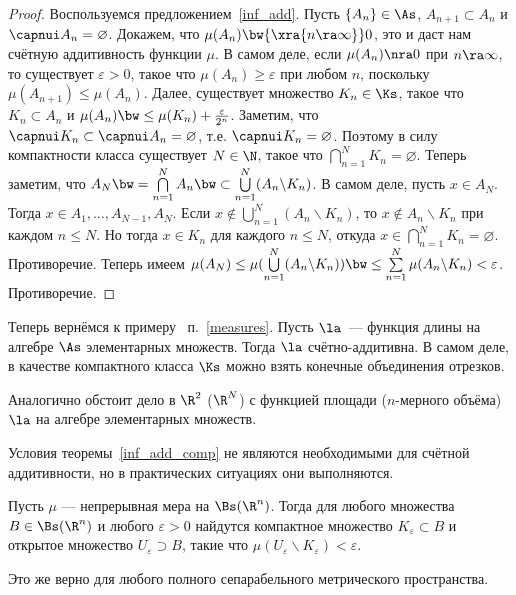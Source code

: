 \documentclass[10pt]{article}
\newcommand{\ve}{\varepsilon}
\begin{document}
\begin{proof}
Воспользуемся предложением~\ref{inf_add}. Пусть $\{A_n\}\in\As$,
$A_{n+1}\subset A_n$ и $\capnui A_n=\varnothing$. Докажем, что
$\mu(A_n) \bw{\mathbin{\xra{n\ra\infty}}}0$, это и даст нам счётную
аддитивность функции $\mu$. В самом деле, если $\mu(A_n)\nra0$ при
$n\ra\infty$, то существует $\ve>0$, такое что $\mu(A_n)\ge\ve$ при
любом $n$, поскольку $\mu(A_{n+1})\le\mu(A_n)$. Далее, существует
множество $K_n\in\Ks$, такое что $K_n\subset A_n$ и $\mu(A_n)\bw\le
\mu(K_n)+\frac{\ve}{2^n}$. Заметим, что $\capnui K_n\subset\capnui
A_n=\varnothing$, т.е. $\capnui K_n=\varnothing$. Поэтому в силу
компактности класса существует $N\in\N$, такое что
$\bigcap\limits_{n=1}^N K_n=\varnothing$. Теперь заметим, что
$A_N\bw =\bigcap\limits_{n=1}^NA_n\bw \subset
\bigcup\limits_{n=1}^N(A_n\backslash K_n)$. В самом деле, пусть
$x\in A_N$. Тогда $x\in A_1,\ldots,A_{N-1},A_N$. Если
$x\notin\bigcup\limits_{n=1}^N(A_n\backslash K_n)$, то $x\notin
A_n\backslash K_n$ при каждом $n\le N$. Но тогда $x\in K_n$ для
каждого $n\le N$, откуда
$x\in\bigcap\limits_{n=1}^NK_n=\varnothing$. Противоречие. Теперь
имеем $\mu(A_N)\le\mu(\bigcup\limits_{n=1}^N(A_n\backslash K_n))
\bw\le\sum\limits_{n=1}^N\mu(A_n\backslash K_n)<\ve$. Противоречие.
\end{proof}

Теперь вернёмся к примеру~ п.~\ref{measures}. Пусть $\la$~---
функция длины на алгебре $\As$ элементарных множеств. Тогда $\la$
счётно-аддитивна. В самом деле, в качестве компактного класса $\Ks$
можно взять конечные объединения отрезков.

Аналогично обстоит дело в $\R^2$ ($\R^N$) с функцией площади
($n$-мерного объёма) $\la$ на алгебре элементарных множеств.

\begin{note}
Условия теоремы~\ref{inf_add_comp} не являются необходимыми для
счётной аддитивности, но в практических ситуациях они выполняются.
\end{note}

\begin{problem}
Пусть $\mu$ --- непрерывная мера на $\Bs(\R^n)$. Тогда для любого
множества $B\in\Bs(\R^n)$ и любого $\ve>0$ найдутся компактное
множество $K_{\ve}\subset B$ и открытое множество $U_{\ve}\supset
B$, такие что $\mu(U_{\ve}\backslash K_{\ve})<\ve$.
\end{problem}

\begin{note}
Это же верно для любого полного сепарабельного метрического
пространства.
\end{note}
\end{document}
